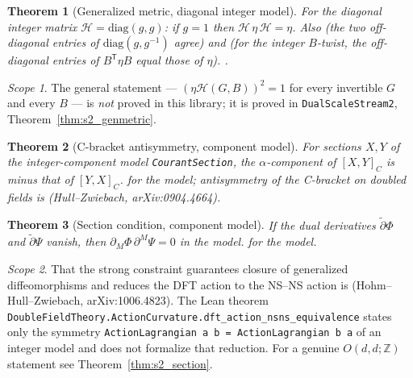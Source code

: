 \documentclass[11pt,a4paper]{report}
\newtheorem{theorem}{Theorem}[chapter]
\theoremstyle{remark}
\newtheorem*{scope}{Scope}
\begin{document}
\begin{theorem}[Generalized metric, diagonal integer model]\label{thm:coset_involution}
\leanok
{}
For the diagonal integer matrix $\mathcal{H}=\mathrm{diag}(g,g)$: if $g=1$ then
$\mathcal{H}\,\eta\,\mathcal{H}=\eta$. Also
\leanok
(the two off-diagonal entries of $\mathrm{diag}(g,g^{-1})$ agree) and
\leanok
(for the integer $B$-twist, the off-diagonal entries of $B^{\mathsf T}\eta B$ equal those of $\eta$). \TA{}.
\end{theorem}
\begin{scope}
The general statement --- $(\eta\mathcal{H}(G,B))^2=1$ for every invertible $G$ and every $B$ --- is
\emph{not} proved in this library; it is proved in \texttt{DualScaleStream2}, Theorem~\ref{thm:s2_genmetric}.
\end{scope}

\begin{theorem}[C-bracket antisymmetry, component model]\label{thm:c_bracket_antisym}
\leanok
For sections $X,Y$ of the integer-component model \texttt{CourantSection}, the $\alpha$-component of
$[X,Y]_C$ is minus that of $[Y,X]_C$. \TA{} for the model; antisymmetry of the C-bracket on doubled fields
is \TL{} (Hull--Zwiebach, arXiv:0904.4664).
\end{theorem}

\begin{theorem}[Section condition, component model]\label{thm:section_condition}
\leanok
If the dual derivatives $\tilde\partial\Phi$ and $\tilde\partial\Psi$ vanish, then
$\partial_M\Phi\,\partial^M\Psi=0$ in the model. \TA{} for the model.
\end{theorem}
\begin{scope}
That the strong constraint guarantees closure of generalized diffeomorphisms and reduces the DFT action to
the NS--NS action is \TL{} (Hohm--Hull--Zwiebach, arXiv:1006.4823). The Lean theorem
\texttt{DoubleFieldTheory.ActionCurvature.dft\_action\_nsns\_equivalence} states only the symmetry
\texttt{ActionLagrangian a b = ActionLagrangian b a} of an integer model and does not formalize that
reduction. For a genuine $O(d,d;\mathbb{Z})$ statement see Theorem~\ref{thm:s2_section}.
\end{scope}
\end{document}
